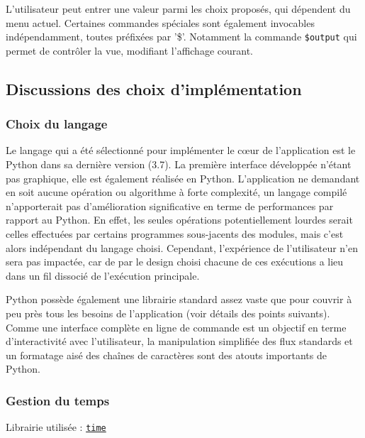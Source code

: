 \documentclass[]{article}
\begin{document}
\par L'utilisateur peut entrer une valeur parmi les choix proposés, qui dépendent du menu actuel. Certaines commandes spéciales sont également invocables indépendamment, toutes préfixées par '\$'. Notamment la commande \texttt{\$output} qui permet de contrôler la vue, modifiant l'affichage courant.


\newpage

\subsection{Discussions des choix d'implémentation}

\subsubsection{Choix du langage}

Le langage qui a été sélectionné pour implémenter le cœur de l'application est le Python dans sa dernière version (3.7). La première interface développée n'étant pas graphique, elle est également réalisée en Python. L'application ne demandant en soit aucune opération ou algorithme à forte complexité, un langage compilé n'apporterait pas d'amélioration significative en terme de performances par rapport au Python. En effet, les seules opérations potentiellement lourdes serait celles effectuées par certains programmes sous-jacents des modules, mais c'est alors indépendant du langage choisi. Cependant, l'expérience de l'utilisateur n'en sera pas impactée, car de par le design choisi chacune de ces exécutions a lieu dans un fil dissocié de l'exécution principale.\\

\par Python possède également une librairie standard assez vaste que pour couvrir à peu près tous les besoins de l'application (voir détails des points suivants). Comme une interface complète en ligne de commande est un objectif en terme d'interactivité avec l'utilisateur, la manipulation simplifiée des flux standards et un formatage aisé des chaînes de caractères sont des atouts importants de Python.

\subsubsection{Gestion du temps}

\noindent Librairie utilisée : \href{https://docs.python.org/3/library/time.html}{\texttt{time}}\\
\end{document}
